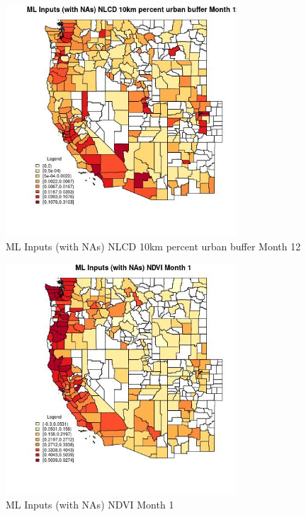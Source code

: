 \begin{figure} 
\centering  
\includegraphics[width=0.77\textwidth]{Code_Outputs/Report_ML_input_PM25_Step4_part_f_de_duplicated_aveswNAs_CountyNLCD_10km_percent_urban_buffermedianMonth12.jpg} 
\caption{\label{fig:Report_ML_input_PM25_Step4_part_f_de_duplicated_aveswNAsCountyNLCD_10km_percent_urban_buffermedianMonth12}ML Inputs (with NAs) NLCD 10km percent urban buffer Month 12} 
\end{figure} 
 

\begin{figure} 
\centering  
\includegraphics[width=0.77\textwidth]{Code_Outputs/Report_ML_input_PM25_Step4_part_f_de_duplicated_aveswNAs_CountyNDVImedianMonth1.jpg} 
\caption{\label{fig:Report_ML_input_PM25_Step4_part_f_de_duplicated_aveswNAsCountyNDVImedianMonth1}ML Inputs (with NAs) NDVI Month 1} 
\end{figure} 
 

